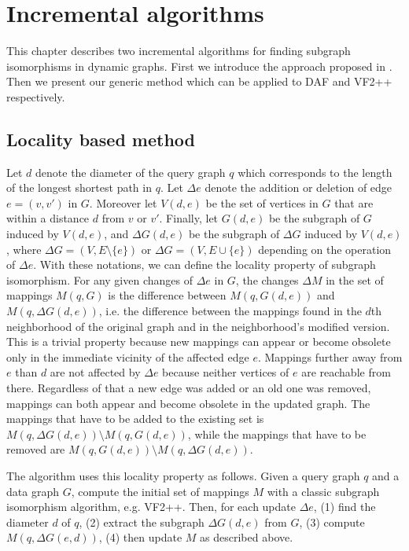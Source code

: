 \chapter{Incremental algorithms}

This chapter describes two incremental algorithms for finding subgraph isomorphisms
in dynamic graphs. First we introduce the approach proposed in \cite{incrementalpatternmatching}. Then we present
our generic method which can be applied to DAF and VF2++ respectively.



\section{Locality based method}

Let \(d\) denote the diameter of the query graph \(q\) which corresponds to the 
length of the longest shortest path in $q$. Let $\Delta e$ denote the addition or
deletion of edge $e = (v, v')$ in $G$. Moreover let $V(d, e)$ be the set of vertices
in $G$ that are within a distance $d$ from $v$ or $v'$. Finally, let $G(d, e)$
be the subgraph of $G$ induced by $V(d, e)$, and $\Delta G(d, e)$ be the subgraph
of $\Delta G$ induced by $V(d, e)$, where $\Delta G = (V, E \setminus \{e\})$ or
$\Delta G = (V, E \cup \{e\})$ depending on the operation of $\Delta e$. With these
notations, we can define the locality property of subgraph isomorphism. For any 
given changes of $\Delta e$ in $G$, the changes $\Delta M$ in the set of mappings
$M(q, G)$ is the difference between $M(q, G(d, e))$ and $M(q, \Delta G(d, e))$, i.e.
the difference between the mappings found in the $d$th neighborhood of the original graph
and in the neighborhood's modified version. This is a trivial property because new mappings can 
appear or become obsolete only in the immediate vicinity of the affected edge $e$. 
Mappings further away from $e$ than $d$ are not affected by $\Delta e$ because neither 
vertices of $e$ are reachable from there. Regardless of that a new edge was added
or an old one was removed, mappings can both appear and become obsolete in the updated
graph. The mappings that have to be added to the existing set is 
$M(q, \Delta G(d, e)) \setminus M(q, G(d, e))$, while the mappings that have to be
removed are $M(q, G(d, e)) \setminus M(q, \Delta G(d, e))$.

The algorithm uses this locality property as follows. Given a query graph $q$ and a 
data graph $G$, compute the initial set of mappings $M$ with a classic subgraph 
isomorphism algorithm, e.g. VF2++. Then, for each update $\Delta e$, (1) find the 
diameter $d$ of $q$, (2) extract the subgraph $\Delta G(d, e)$ from $G$, (3) compute 
$M(q, \Delta G(e, d))$, (4) then update $M$ as described above.

